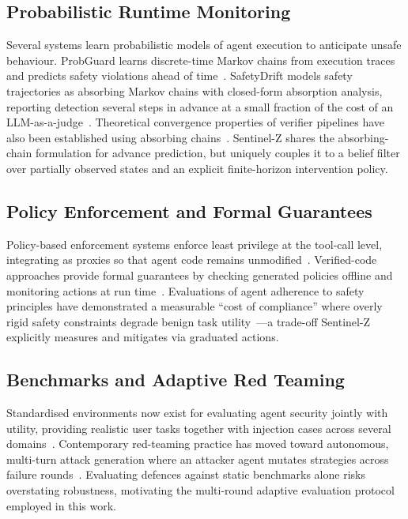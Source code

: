 \documentclass[conference]{IEEEtran}
\begin{document}
\subsection{Probabilistic Runtime Monitoring}
Several systems learn probabilistic models of agent execution to anticipate unsafe behaviour. ProbGuard learns discrete-time Markov chains from execution traces and predicts safety violations ahead of time~\cite{wang2026probguard}. SafetyDrift models safety trajectories as absorbing Markov chains with closed-form absorption analysis, reporting detection several steps in advance at a small fraction of the cost of an LLM-as-a-judge~\cite{dhodapkar2026safetydrift}. Theoretical convergence properties of verifier pipelines have also been established using absorbing chains~\cite{dantas2025bound}. Sentinel-Z shares the absorbing-chain formulation for advance prediction, but uniquely couples it to a belief filter over partially observed states and an explicit finite-horizon intervention policy.

\subsection{Policy Enforcement and Formal Guarantees}
Policy-based enforcement systems enforce least privilege at the tool-call level, integrating as proxies so that agent code remains unmodified~\cite{shi2025progent,debenedetti2025defeating}. Verified-code approaches provide formal guarantees by checking generated policies offline and monitoring actions at run time~\cite{miculicich2025veriguard}. Evaluations of agent adherence to safety principles have demonstrated a measurable ``cost of compliance'' where overly rigid safety constraints degrade benign task utility~\cite{potham2025evaluating}---a trade-off Sentinel-Z explicitly measures and mitigates via graduated actions.

\subsection{Benchmarks and Adaptive Red Teaming}
Standardised environments now exist for evaluating agent security jointly with utility, providing realistic user tasks together with injection cases across several domains~\cite{debenedetti2024agentdojo,zhan2024injecagent}. Contemporary red-teaming practice has moved toward autonomous, multi-turn attack generation where an attacker agent mutates strategies across failure rounds~\cite{mohammadi2025evaluation}. Evaluating defences against static benchmarks alone risks overstating robustness, motivating the multi-round adaptive evaluation protocol employed in this work.
\end{document}
